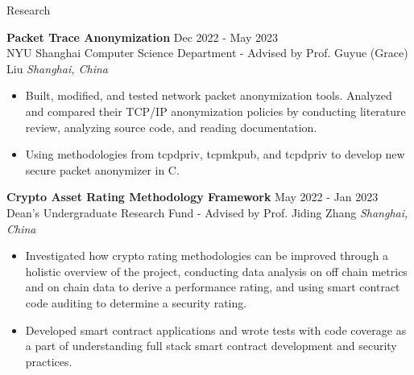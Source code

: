 \documentclass{cv} %
\begin{document}
\begin{rSection}{Research}

	\textbf{Packet Trace Anonymization} \hfill Dec 2022 - May 2023 \\
	NYU Shanghai Computer Science Department - Advised by Prof. Guyue (Grace) Liu \hfill \textit{Shanghai, China}
	\begin{itemize}
		\item Built, modified, and tested network packet anonymization tools. Analyzed and compared their TCP/IP anonymization policies by conducting literature review, analyzing source code, and reading documentation.
		\item Using methodologies from tcpdpriv, tcpmkpub, and tcpdpriv to develop new secure packet anonymizer in C.
	\end{itemize}

	\textbf{Crypto Asset Rating Methodology Framework} \hfill May 2022 - Jan 2023 \\
	Dean’s Undergraduate Research Fund - Advised by Prof. Jiding Zhang \hfill \textit{Shanghai, China}
	\begin{itemize}
		\item Investigated how crypto rating methodologies can be improved through a holistic overview of the project, conducting data analysis on off chain metrics and on chain data to derive a performance rating, and using smart contract code auditing to determine a security rating.
		\item Developed smart contract applications and wrote tests with code coverage as a part of understanding full stack smart contract development and security practices.
	\end{itemize}

\end{rSection}
\end{document}
